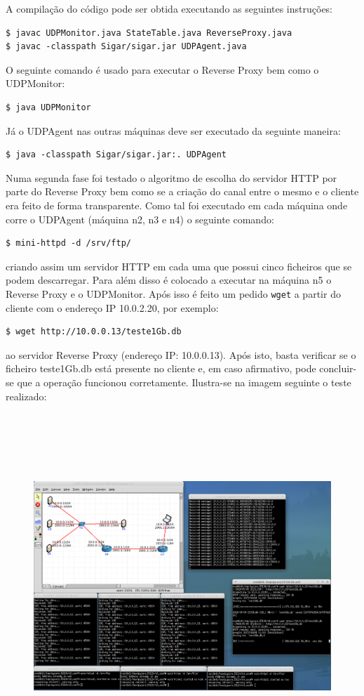 \documentclass{article}
\begin{document}
A compilação do código pode ser obtida executando as seguintes instruções:
\begin{verbatim}
$ javac UDPMonitor.java StateTable.java ReverseProxy.java
$ javac -classpath Sigar/sigar.jar UDPAgent.java
\end{verbatim}
O seguinte comando é usado para executar o Reverse Proxy bem como o UDPMonitor:
\begin{verbatim}
$ java UDPMonitor
\end{verbatim}
Já o UDPAgent nas outras máquinas deve ser executado da seguinte maneira:
\begin{verbatim}
$ java -classpath Sigar/sigar.jar:. UDPAgent
\end{verbatim}

Numa segunda fase foi testado o algoritmo de escolha do servidor HTTP por parte do Reverse Proxy bem como se a criação do canal entre o mesmo e o cliente era feito de forma transparente.
Como tal foi executado em cada máquina onde corre o UDPAgent (máquina n2, n3 e n4) o seguinte comando:
\begin{verbatim}
$ mini-httpd -d /srv/ftp/
\end{verbatim}
criando assim um servidor HTTP em cada uma que possui cinco ficheiros que se podem descarregar. Para além disso é colocado a executar na máquina n5 o Reverse Proxy e o UDPMonitor.
Após isso é feito um pedido \texttt{wget} a partir do cliente com o endereço IP 10.0.2.20, por exemplo:
\begin{verbatim}
$ wget http://10.0.0.13/teste1Gb.db
\end{verbatim}
ao servidor Reverse Proxy (endereço IP: 10.0.0.13). Após isto, basta verificar se o ficheiro teste1Gb.db está presente no cliente e, em caso afirmativo, pode concluir-se que a operação funcionou corretamente. Ilustra-se na imagem seguinte o teste realizado:
\begin{figure}[H]
	\advance\leftskip-3cm
    \includegraphics[height=13cm]{teste2.png}
\end{figure}
\end{document}
